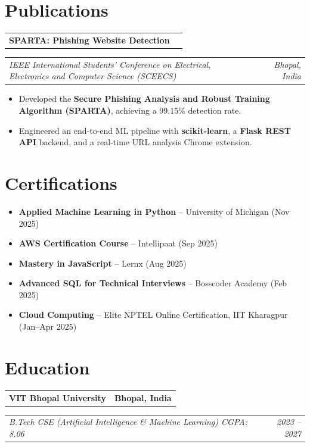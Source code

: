\documentclass[10pt,a4paper]{article}
\makeatletter
\newcommand{\resumeHeader}[2]{%
  \noindent
  \begin{tabular*}{\textwidth}{@{}l@{\extracolsep{\fill}}r@{}}
    \textbf{#1} & \textbf{#2} \\
  \end{tabular*}%
  \vspace{-2pt}
}
\newcommand{\resumeSubheader}[2]{%
  \noindent
  \begin{tabular*}{\textwidth}{@{}l@{\extracolsep{\fill}}r@{}}
    \textit{#1} & \textit{#2} \\
  \end{tabular*}\vspace{1pt}%
}
\makeatother
\begin{document}
\section{Publications}

\resumeHeader{SPARTA: Phishing Website Detection}{}
\resumeSubheader{IEEE International Students' Conference on Electrical, Electronics and Computer Science (SCEECS)}{Bhopal, India}
\begin{itemize}
  \item Developed the \textbf{Secure Phishing Analysis and Robust Training Algorithm (SPARTA)}, achieving a 99.15\% detection rate.
  \item Engineered an end-to-end ML pipeline with \textbf{scikit-learn}, a \textbf{Flask REST API} backend, and a real-time URL analysis Chrome extension.
\end{itemize}

\section{Certifications}
\begin{itemize}
  \item \textbf{Applied Machine Learning in Python} -- University of Michigan (Nov 2025)
  \item \textbf{AWS Certification Course} -- Intellipaat (Sep 2025)
  \item \textbf{Mastery in JavaScript} -- Lernx (Aug 2025)
  \item \textbf{Advanced SQL for Technical Interviews} -- Bosscoder Academy (Feb 2025)
  \item \textbf{Cloud Computing} -- Elite NPTEL Online Certification, IIT Kharagpur (Jan--Apr 2025)
\end{itemize}

\section{Education}

\resumeHeader{VIT Bhopal University}{Bhopal, India}
\resumeSubheader{B.Tech CSE (Artificial Intelligence \& Machine Learning) \textbar{} CGPA: 8.06}{2023 -- 2027}
\end{document}
